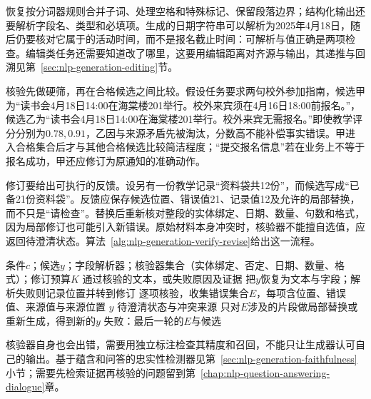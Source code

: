 恢复按分词器规则合并子词、处理空格和特殊标记、保留段落边界；结构化输出还要解析字段名、类型和必填项。生成的日期字符串可以解析为2025年4月18日，随后仍要核对它属于的活动时间，而不是报名截止时间：可解析与值正确是两项检查。编辑类任务还需要知道改了哪里，这要用编辑距离对齐源与输出，其递推与回溯见第~\ref{sec:nlp-generation-editing}节。

核验先做硬筛，再在合格候选之间比较。假设任务要求两句校外参加指南，候选甲为“读书会4月18日14:00在海棠楼201举行。校外来宾须在4月16日18:00前报名。”，候选乙为“读书会4月18日14:00在海棠楼201举行。校外来宾无需报名。”即使教学评分分别为$0.78,0.91$，乙因与来源矛盾先被淘汰，分数高不能补偿事实错误。甲进入合格集合后才与其他合格候选比较简洁程度；“提交报名信息”若在业务上不等于报名成功，甲还应修订为原通知的准确动作。

修订要给出可执行的反馈。设另有一份教学记录“资料袋共12份”，而候选写成“已备21份资料袋”。反馈应保存候选位置、错误值21、记录值12及允许的局部替换，而不只是“请检查”。替换后重新核对整段的实体绑定、日期、数量、句数和格式，因为局部修订也可能引入新错误。原始材料本身冲突时，核验器不能擅自选值，应返回待澄清状态。算法~\ref{alg:nlp-generation-verify-revise}给出这一流程。

\begin{algorithm}
  \label{alg:nlp-generation-verify-revise}
  \begin{algorithmic}[1]
    \Require 条件$c$；候选$y$；字段解析器；核验器集合（实体绑定、否定、日期、数量、格式）；修订预算$K$
    \Ensure 通过核验的文本，或失败原因及证据
      \State 把$y$恢复为文本与字段；解析失败则记录位置并转到修订
      \State 逐项核验，收集错误集合$E$，每项含位置、错误值、来源值与来源位置
        \State \Return $y$
      \EndIf
        \State \Return 待澄清状态与冲突来源
      \EndIf
      \State 只对$E$涉及的片段做局部替换或重新生成，得到新的$y$
    \EndFor
    \State \Return 失败：最后一轮的$E$与候选
  \end{algorithmic}
\end{algorithm}

核验器自身也会出错，需要用独立标注检查其精度和召回，不能只让生成器认可自己的输出。基于蕴含和问答的忠实性检测器见第~\ref{sec:nlp-generation-faithfulness}小节；需要先检索证据再核验的问题留到第~\ref{chap:nlp-question-answering-dialogue}章。
